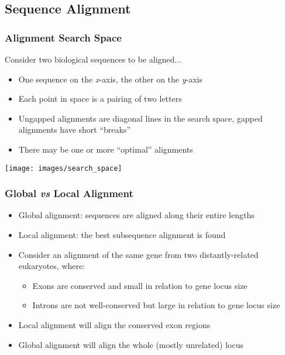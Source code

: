 %

\subsection{Sequence Alignment}
\begin{frame}
  \frametitle{Alignment Search Space}
  Consider two biological sequences to be aligned$\ldots$
  \begin{itemize}
    \item One sequence on the \textit{x}-axis, the other on the \textit{y}-axis
    \item Each point in space is a pairing of two letters
    \item Ungapped alignments are diagonal lines in the search space, gapped alignments have short ``breaks''
    \item There may be one or more ``optimal'' alignments
  \end{itemize}
  \begin{center}
    \texttt{[image: images/search\_space]} 
  \end{center}
\end{frame}
    
\begin{frame}
  \frametitle{Global \textit{vs} Local Alignment}
  \begin{itemize}
    \item<1-> Global alignment: sequences are aligned along their entire lengths
    \item<1-> Local alignment: the best subsequence alignment is found
    \item<2-> Consider an alignment of the same gene from two distantly-related eukaryotes, where:
    \begin{itemize}
      \item<2-> Exons are conserved and small in relation to gene locus size
      \item<2-> Introns are not well-conserved but large in relation to gene locus size
    \end{itemize}
    \item<2-> Local alignment will align the conserved exon regions
    \item<2-> Global alignment will align the whole (mostly unrelated) locus
  \end{itemize}
 \end{frame}
